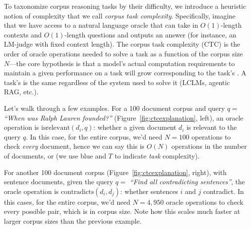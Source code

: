


To taxonomize corpus reasoning tasks by their difficulty, we introduce a heuristic notion of complexity that we call \emph{corpus task complexity}. Specifically, imagine that we have access to a natural language oracle that can take in $O(1)$-length contexts and $O(1)$-length questions and outputs an answer (for instance, an LM-judge with fixed context length). The corpus task complexity (CTC) is the order of oracle operations needed to solve a task as a function of the corpus size $N$---the core hypothesis is that a model's actual computation requirements to maintain a given performance on a task will grow corresponding to the task's \cname.  A task's \cname is the same regardless of the system used to solve it (LCLMs, agentic RAG, etc.).

Let's walk through a few examples. For a 100 document corpus and query $q =$ \emph{``When was Ralph Lauren founded?''} (Figure~\ref{fig:ctcexplanation}, left), an oracle operation is $\mathrm{isrelevant}(d_i, q)$: whether a given document $d_i$ is relevant to the query $q$. In this case, for the entire corpus, we'd need $N=100$ operations to check \emph{every} document, hence we can say this is $O(N)$ operations in the number of documents, or  (we use blue and $T$ to indicate \emph{task} complexity). 

For another 100 document corpus (Figure~\ref{fig:ctcexplanation}, right), with sentence documents, given the query $q =$ \emph{``Find all contradicting sentences''}, the oracle operation is $\mathrm{contradicts}(d_i, d_j)$: whether sentences $i$ and $j$ contradict. In this cases, for the entire corpus, we'd need $N=4,950$ oracle operations to check every possible pair, which is  in corpus size. Note how this scales much faster at larger corpus sizes than the previous example.


